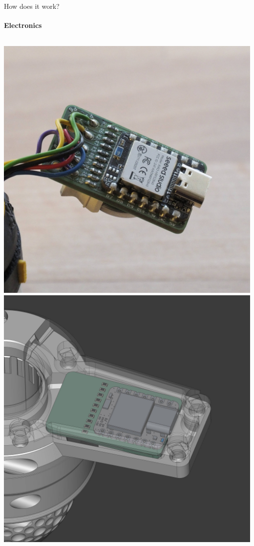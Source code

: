 \documentclass[
    english,
    accentcolor=9c,
    design=2023,
    logofile=images/hulogo.pdf,
]{tudabeamer}
\begin{document}
\begin{frame}{How does it work?}
    \framesubtitle{Electronics}
    \begin{columns}[onlytextwidth,c]
        \centering
        \includegraphics[height=0.7\linewidth]{../images/likertshift_pcb.jpg}
        \centering
        \includegraphics[height=0.7\linewidth]{../images/cad_pcb_compartment.jpg}
    \end{columns}
\end{frame}
\end{document}
